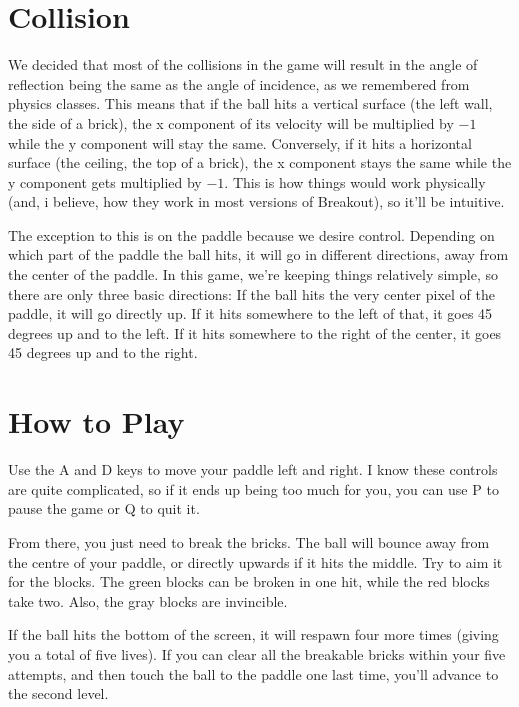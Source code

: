 \documentclass{article}
\begin{document}
\section{Collision}
We decided that most of the collisions in the game will result in the angle of reflection being the same as the angle of incidence, as we remembered from physics classes. This means that if the ball hits a vertical surface (the left wall, the side of a brick), the x component of its velocity will be multiplied by $-1$ while the y component will stay the same. Conversely, if it hits a horizontal surface (the ceiling, the top of a brick), the x component stays the same while the y component gets multiplied by $-1$. This is how things would work physically (and, i believe, how they work in most versions of Breakout), so it'll be intuitive.

The exception to this is on the paddle because we desire control. Depending on which part of the paddle the ball hits, it will go in different directions, away from the center of the paddle. In this game, we're keeping things relatively simple, so there are only three basic directions: If the ball hits the very center pixel of the paddle, it will go directly up. If it hits somewhere to the left of that, it goes 45 degrees up and to the left. If it hits somewhere to the right of the center, it goes 45 degrees up and to the right. 

\section{How to Play}
Use the A and D keys to move your paddle left and right. I know these controls are quite complicated, so if it ends up being too much for you, you can use P to pause the game or Q to quit it.

From there, you just need to break the bricks. The ball will bounce away from the centre of your paddle, or directly upwards if it hits the middle. Try to aim it for the blocks. The green blocks can be broken in one hit, while the red blocks take two. Also, the gray blocks are invincible.

If the ball hits the bottom of the screen, it will respawn four more times (giving you a total of five lives). If you can clear all the breakable bricks within your five attempts, and then touch the ball to the paddle one last time, you'll advance to the second level.
\end{document}

